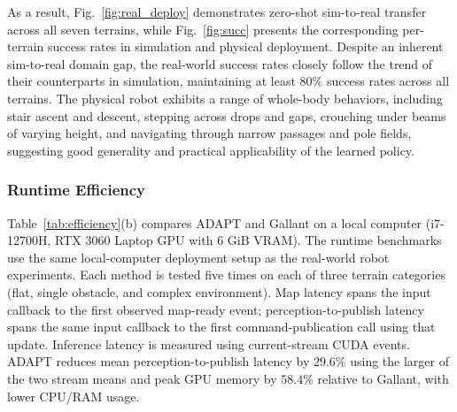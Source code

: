 \documentclass[letterpaper, 10 pt, conference]{ieeeconf/ieeeconf}
\DeclareRobustCommand{\RevisionAdd}[1]{{\color{red}#1}}
\begin{document}
\RevisionAdd{As a result, Fig.~\ref{fig:real_deploy} demonstrates zero-shot sim-to-real transfer across all seven terrains, while Fig.~\ref{fig:succ} presents the corresponding per-terrain success rates in simulation and physical deployment.} Despite an inherent sim-to-real domain gap, the real-world success rates closely follow the trend of their counterparts in simulation, maintaining \RevisionAdd{at least }$80\%$ success rates across all terrains. The physical robot exhibits a range of whole-body behaviors, including stair ascent and descent, stepping across drops and gaps, crouching under beams of varying height, and navigating through narrow passages and pole fields, suggesting good generality and practical applicability of the learned policy. 

\subsubsection{\RevisionAdd{Runtime Efficiency}}
\RevisionAdd{Table~\ref{tab:efficiency}(b) compares ADAPT and Gallant on a local computer (i7-12700H, RTX 3060 Laptop GPU with 6 GiB VRAM). The runtime benchmarks use the same local-computer deployment setup as the real-world robot experiments. Each method is tested five times on each of three terrain categories (flat, single obstacle, and complex environment). Map latency spans the input callback to the first observed map-ready event; perception-to-publish latency spans the same input callback to the first command-publication call using that update. Inference latency is measured using current-stream CUDA events. ADAPT reduces mean perception-to-publish latency by $29.6\%$ using the larger of the two stream means and peak GPU memory by $58.4\%$ relative to Gallant, with lower CPU/RAM usage.
}


\end{document}
